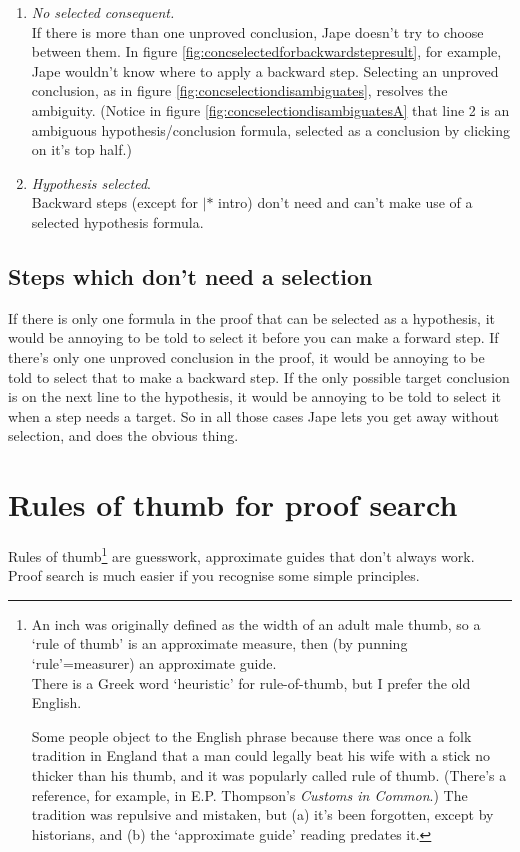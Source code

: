 \documentclass[11pt]{book}
\newcommand{\figref}[1]{figure \ref{fig:#1}}
\begin{document}
\begin{enumerate}
\item \emph{No selected consequent.}\\
If there is more than one unproved conclusion, Jape doesn't try to choose between them. In \figref{concselectedforbackwardstepresult}, for example, Jape wouldn't know where to apply a backward step. Selecting an unproved conclusion, as in \figref{concselectiondisambiguates}, resolves the ambiguity. (Notice in \figref{concselectiondisambiguatesA} that line 2 is an ambiguous hypothesis/conclusion formula, selected as a conclusion by clicking on it's top half.)\\

\item \emph{Hypothesis selected}.\\
Backward steps (except for $|*$ intro) don't need and can't make use of a selected hypothesis formula. 

\end{enumerate}

\section{Steps which don't need a selection}

If there is only one formula in the proof that can be selected 
as a hypothesis, it would be annoying to be told to select it 
before you can make a forward step. If there's only one unproved 
conclusion in the proof, it would be annoying to be told to select 
that to make a backward step. If the only possible target conclusion 
is on the next line to the hypothesis, it would be annoying to 
be told to select it when a step needs a target. So in all those 
cases Jape lets you get away without selection, and does the 
obvious thing.


\chapter{Rules of thumb for proof search}

Rules of thumb\footnote{An inch was originally defined as the width 
of an adult male thumb, so a `rule of thumb' is an approximate 
measure, then (by punning `rule'=measurer) an approximate guide.\\
There is a Greek word `heuristic' for rule-of-thumb, but I 
prefer the old English. 

Some people object to the English phrase 
because there was once a folk tradition in England that a man 
could legally beat his wife with a stick no thicker than his 
thumb, and it was popularly called rule of thumb. (There's 
a reference, for example, in E.P. Thompson's \textit{Customs in Common}.) The tradition 
was repulsive and mistaken, but (a) it's been forgotten, 
except by historians, and (b) the `approximate guide' reading 
predates it.} are guesswork, approximate guides that don't always 
work. Proof search is much easier if you recognise some simple principles.
\end{document}
